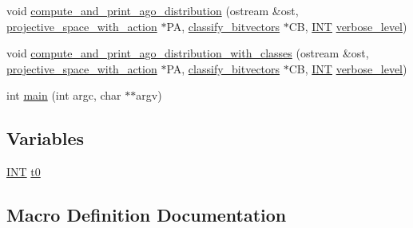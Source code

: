 \begin{DoxyCompactItemize}
\item 
void \mbox{\hyperlink{projective__space__main_8_c_abc36e14ed82bd09be516755b5b717d68}{compute\+\_\+and\+\_\+print\+\_\+ago\+\_\+distribution}} (ostream \&ost, \mbox{\hyperlink{classprojective__space__with__action}{projective\+\_\+space\+\_\+with\+\_\+action}} $\ast$PA, \mbox{\hyperlink{classclassify__bitvectors}{classify\+\_\+bitvectors}} $\ast$CB, \mbox{\hyperlink{galois_8h_a09fddde158a3a20bd2dcadb609de11dc}{I\+NT}} \mbox{\hyperlink{simeon_8_c_a818073fbcc2f439e7c56952f67386122}{verbose\+\_\+level}})
\item 
void \mbox{\hyperlink{projective__space__main_8_c_ac64ecd71e4db92860ba230d89959dd8e}{compute\+\_\+and\+\_\+print\+\_\+ago\+\_\+distribution\+\_\+with\+\_\+classes}} (ostream \&ost, \mbox{\hyperlink{classprojective__space__with__action}{projective\+\_\+space\+\_\+with\+\_\+action}} $\ast$PA, \mbox{\hyperlink{classclassify__bitvectors}{classify\+\_\+bitvectors}} $\ast$CB, \mbox{\hyperlink{galois_8h_a09fddde158a3a20bd2dcadb609de11dc}{I\+NT}} \mbox{\hyperlink{simeon_8_c_a818073fbcc2f439e7c56952f67386122}{verbose\+\_\+level}})
\item 
int \mbox{\hyperlink{projective__space__main_8_c_a3c04138a5bfe5d72780bb7e82a18e627}{main}} (int argc, char $\ast$$\ast$argv)
\end{DoxyCompactItemize}
\subsection*{Variables}
\begin{DoxyCompactItemize}
\item 
\mbox{\hyperlink{galois_8h_a09fddde158a3a20bd2dcadb609de11dc}{I\+NT}} \mbox{\hyperlink{projective__space__main_8_c_a4268f4fe222ffb119218a0199f5e1904}{t0}}
\end{DoxyCompactItemize}


\subsection{Macro Definition Documentation}
\mbox{\label{projective__space__main_8_c_a0fb86fbcc19f8e38e125003aaf4d42c6}} 
